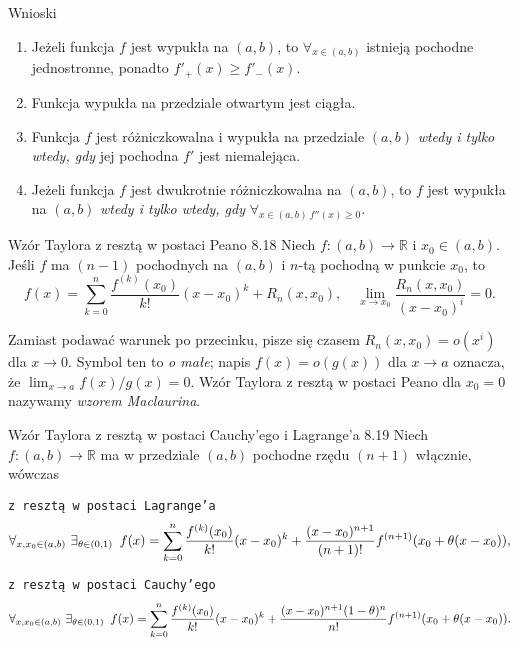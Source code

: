 \documentclass{article}
\newcommand{\hquad}{\mkern9mu}
\newcommand{\R}{\mathbb{R}}
\begin{document}
\begin{wn}{Wnioski}
\begin{enumerate}
    \item Jeżeli funkcja $f$ jest wypukła na $(a,b)$, to $\forall_{x\in(a,b)}$ istnieją pochodne jednostronne, ponadto $f'_{+}(x)\ge f'_{-}(x)$.
    \item Funkcja wypukła na przedziale otwartym jest ciągła.
    \item Funkcja $f$ jest różniczkowalna i wypukła na przedziale $(a,b)$ \textit{wtedy i tylko wtedy, gdy} jej pochodna $f'$ jest niemalejąca.
    \item Jeżeli funkcja $f$ jest dwukrotnie różniczkowalna na $(a,b)$, to $f$ jest wypukła na $(a,b)$ \textit{wtedy i tylko wtedy, gdy} $\forall_{x\in(a,b)\ f''(x)\ge0}$.
\end{enumerate}
\end{wn}

\begin{twier}{Wzór Taylora z resztą w postaci Peano 8.18}
    Niech $f:(a,b)\to\R$ i $x_0\in(a,b)$. Jeśli $f$ ma $(n-1)$ pochodnych na $(a,b)$ i $n$-tą pochodną w punkcie $x_0$, to
    \begin{equation*}
        f(x)=\sum_{k=0}^{n}{\frac{f^{(k)}(x_0)}{k!}(x-x_0)^k}+R_n(x,x_0),\quad \lim_{x\to x_0}{\frac{R_n(x,x_0)}{(x-x_0)^i}}=0.
    \end{equation*}
\end{twier}

Zamiast podawać warunek po przecinku, pisze się czasem $R_n(x,x_0)=o(x^i)$ dla $x\to0$. Symbol ten to \textit{o małe}; napis $f(x)=o(g(x))$ dla $x\to a$ oznacza, że $\lim_{x\to a}{f(x)/g(x)}=0$. Wzór Taylora z resztą w postaci Peano dla $x_0=0$ nazywamy \textit{wzorem Maclaurina}.

\begin{twier}{Wzór Taylora z resztą w postaci Cauchy'ego i Lagrange'a 8.19}
    Niech $f:(a,b)\to\R$ ma w przedziale $(a,b)$ pochodne rzędu $(n+1)$ włącznie, wówczas\medskip

    \hfill \texttt{z resztą w postaci Lagrange'a}\\ 
    \begin{equation*}
        \forall_{x,x_0\in(a,b)}\ \exists_{\theta\in(0,1)}\hquad f(x)=\sum_{k=0}^{n}{\frac{f^{(k)}(x_0)}{k!}(x-x_0)^k}+\frac{(x-x_0)^{n+1}}{(n+1)!}f^{(n+1)}(x_0+\theta(x-x_0)),
    \end{equation*}

    \hfill \texttt{z resztą w postaci Cauchy'ego}\\
    \begin{equation*}
        \forall_{x,x_0\in(a,b)}\ \exists_{\theta\in(0,1)}\hquad f(x)=\sum_{k=0}^{n}{\frac{f^{(k)}(x_0)}{k!}(x-x_0)^k}+\frac{(x-x_0)^{n+1}(1-\theta)^{n}}{n!}f^{(n+1)}(x_0+\theta(x-x_0)).
    \end{equation*}
\end{twier}
\end{document}
